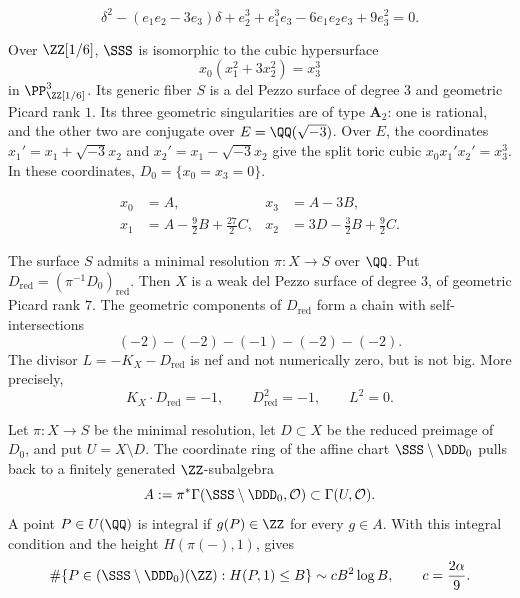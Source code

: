 \begin{equation}\label{eqn:surfaceInvariantRelation} \delta^2-(e_1e_2-3e_3)\delta +e_2^3+e_1^3e_3-6e_1e_2e_3+9e_3^2=0. \end{equation}

\begin{proposition}\label{prop:surfaceRationalForm} Over $\ZZ[1/6]$, $\SSS$ is isomorphic to the cubic hypersurface \begin{equation}\label{eqn:surfaceNormCubic} x_0(x_1^2+3x_2^2)=x_3^3 \end{equation} in $\PP_{\ZZ[1/6]}^3$. Its generic fiber $S$ is a del Pezzo surface of degree $3$ and geometric Picard rank $1$. Its three geometric singularities are of type $\mathbf A_2$: one is rational, and the other two are conjugate over $E=\QQ(\sqrt{-3})$. Over $E$, the coordinates $x_1'=x_1+\sqrt{-3}x_2$ and $x_2'=x_1-\sqrt{-3}x_2$ give the split toric cubic $x_0x_1'x_2'=x_3^3$. In these coordinates, $D_0=\{x_0=x_3=0\}$. \end{proposition}

\begin{equation}\label{eqn:surfaceCoordinateChange} \begin{aligned} x_0&=A,& x_3&=A-3B,\\ x_1&=A-\tfrac92B+\tfrac{27}{2}C,& x_2&=3D-\tfrac32B+\tfrac92C. \end{aligned} \end{equation}

\begin{proposition}\label{prop:surfaceResolvedBoundary} The surface $S$ admits a minimal resolution $\pi\colon X\to S$ over $\QQ$. Put $D_{\mathrm{red}}=(\pi^{-1}D_0)_{\mathrm{red}}$. Then $X$ is a weak del Pezzo surface of degree $3$, of geometric Picard rank $7$. The geometric components of $D_{\mathrm{red}}$ form a chain with self-intersections \begin{equation}\label{eqn:surfaceBoundaryChain} (-2)-(-2)-(-1)-(-2)-(-2). \end{equation} The divisor $L=-K_X-D_{\mathrm{red}}$ is nef and not numerically zero, but is not big. More precisely, \begin{equation}\label{eqn:surfaceLogIntersections} K_X\cdot D_{\mathrm{red}}=-1,\qquad D_{\mathrm{red}}^2=-1,\qquad L^2=0. \end{equation} \end{proposition}

\begin{proposition}\label{prop:santensConstant} Let $\pi\colon X\to S$ be the minimal resolution, let $D\subset X$ be the reduced preimage of $D_0$, and put $U=X\setminus D$. The coordinate ring of the affine chart $\SSS\setminus\DDD_0$ pulls back to a finitely generated $\ZZ$-subalgebra \[ A:=\pi^*\Gamma(\SSS\setminus\DDD_0,\mathcal O) \subset\Gamma(U,\mathcal O). \] A point $P\in U(\QQ)$ is integral if $g(P)\in\ZZ$ for every $g\in A$. With this integral condition and the height $H(\pi(-),1)$, \cite[Theorem~8.7]{santens2023integral} gives \[ \#\{P\in(\SSS\setminus\DDD_0)(\ZZ):H(P,1)\leq B\} \sim cB^2\log B,\qquad c=\frac{2\alpha}{9}. \] \end{proposition}


